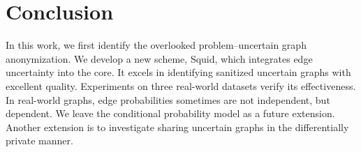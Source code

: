 \section{Conclusion}
In this work, we first identify the overlooked problem–uncertain graph anonymization. 
We develop a new scheme, Squid, which integrates edge uncertainty into the core. 
It excels in identifying sanitized uncertain graphs with excellent quality. 
Experiments on three real-world datasets verify its effectiveness. 
In real-world graphs, edge probabilities sometimes are not independent, but dependent.  We leave the conditional probability model as a future extension. 
Another extension is to investigate sharing uncertain graphs in the differentially private manner.